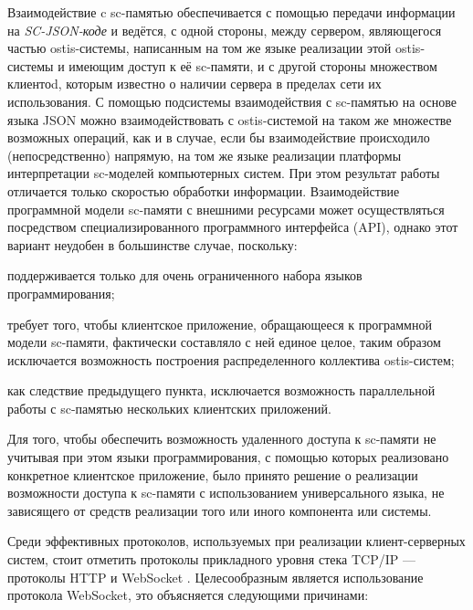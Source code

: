 Взаимодействие c sc-памятью обеспечивается с помощью передачи информации на \textit{SC-JSON-коде} и ведётся, с одной стороны, между сервером, являющегося частью ostis-системы, написанным на том же языке реализации этой ostis-системы и имеющим доступ к её sc-памяти, и с другой стороны множеством клиентоd, которым известно о наличии сервера в пределах сети их использования. С помощью подсистемы взаимодействия с sc-памятью на основе языка JSON можно взаимодействовать с ostis-системой на таком же множестве возможных операций, как и в случае, если бы взаимодействие происходило (непосредственно) напрямую, на том же языке реализации платформы интерпретации sc-моделей компьютерных систем. При этом результат работы отличается только скоростью обработки информации.
Взаимодействие программной модели sc-памяти с внешними ресурсами может осуществляться посредством специализированного программного интерфейса (API), однако этот вариант неудобен в большинстве случае, поскольку:
    \begin{textitemize}
        \item поддерживается только для очень ограниченного набора языков программирования;
        \item требует того, чтобы клиентское приложение, обращающееся к программной модели sc-памяти, фактически составляло с ней единое целое, таким образом исключается возможность построения распределенного коллектива ostis-систем;
        \item как следствие предыдущего пункта, исключается возможность параллельной работы с sc-памятью нескольких клиентских приложений.
   \end{textitemize}
Для того, чтобы обеспечить возможность удаленного доступа к sc-памяти не учитывая при этом языки программирования, с помощью которых реализовано конкретное клиентское приложение, было принято решение о реализации возможности доступа к sc-памяти с использованием универсального языка, не зависящего от средств реализации того или иного компонента или системы.

Среди эффективных протоколов, используемых при реализации клиент-серверных систем, стоит отметить протоколы прикладного уровня стека TCP/IP --- протоколы HTTP и WebSocket . Целесообразным является использование протокола WebSocket, это объясняется следующими причинами:

